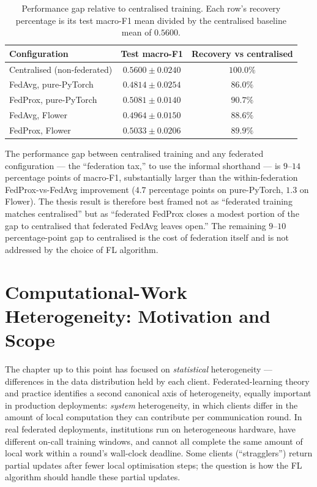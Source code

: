 \documentclass[11pt,a4paper]{report}
\begin{document}
\begin{table}[!htbp]
\centering
\caption{Performance gap relative to centralised training. Each
row's recovery percentage is its test macro-F1 mean divided by the
centralised baseline mean of $0.5600$.}
\label{tab:federation-tax}
\small
\begin{tabular}{lcc}
\toprule
Configuration & Test macro-F1 & Recovery vs centralised \\
\midrule
Centralised (non-federated)         & $\mathbf{0.5600 \pm 0.0240}$ & $100.0\%$ \\
FedAvg, pure-PyTorch                & $0.4814 \pm 0.0254$ & $86.0\%$ \\
FedProx, pure-PyTorch               & $0.5081 \pm 0.0140$ & $90.7\%$ \\
FedAvg, Flower                      & $0.4964 \pm 0.0150$ & $88.6\%$ \\
FedProx, Flower                     & $0.5033 \pm 0.0206$ & $89.9\%$ \\
\bottomrule
\end{tabular}
\end{table}

The performance gap between centralised training and any
federated configuration --- the ``federation tax,'' to use the
informal shorthand --- is $9$--$14$ percentage points of macro-F1,
substantially larger than the within-federation FedProx-vs-FedAvg
improvement ($4.7$ percentage points on pure-PyTorch, $1.3$ on
Flower). The thesis result is therefore best framed not as
``federated training matches centralised'' but as ``federated
FedProx closes a modest portion of the gap to centralised that
federated FedAvg leaves open.'' The remaining $9$--$10$
percentage-point gap to centralised is the cost of federation
itself and is not addressed by the choice of FL algorithm.

\section{Computational-Work Heterogeneity: Motivation and Scope}
\label{sec:system-het-motivation}

The chapter up to this point has focused on \emph{statistical}
heterogeneity --- differences in the data distribution held by
each client. Federated-learning theory and practice identifies
a second canonical axis of heterogeneity, equally important in
production deployments: \emph{system} heterogeneity, in which
clients differ in the amount of local computation they can
contribute per communication round. In real federated
deployments, institutions run on heterogeneous hardware, have
different on-call training windows, and cannot all complete the
same amount of local work within a round's wall-clock deadline.
Some clients (``stragglers'') return partial updates after fewer
local optimisation steps; the question is how the FL algorithm
should handle these partial updates.
\end{document}
